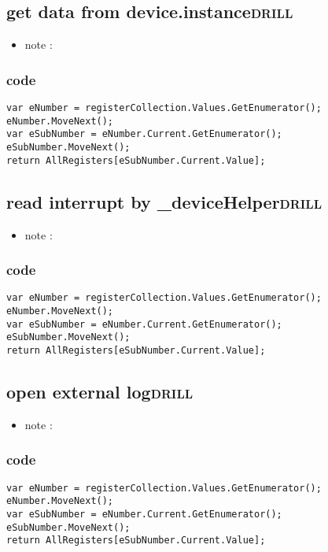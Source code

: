 \documentclass[11pt]{article}
\begin{document}
\subsection{get data from device.instance\hfill{}\textsc{drill}}
\label{sec:org396d1eb}
\begin{itemize}
\item note :
\end{itemize}
\subsubsection{code}
\label{sec:orgec638a7}
\begin{verbatim}
var eNumber = registerCollection.Values.GetEnumerator();
eNumber.MoveNext();
var eSubNumber = eNumber.Current.GetEnumerator();
eSubNumber.MoveNext();
return AllRegisters[eSubNumber.Current.Value];

\end{verbatim}

\subsection{read interrupt by \_deviceHelper\hfill{}\textsc{drill}}
\label{sec:org8c07efc}
\begin{itemize}
\item note :
\end{itemize}
\subsubsection{code}
\label{sec:org504a389}
\begin{verbatim}
var eNumber = registerCollection.Values.GetEnumerator();
eNumber.MoveNext();
var eSubNumber = eNumber.Current.GetEnumerator();
eSubNumber.MoveNext();
return AllRegisters[eSubNumber.Current.Value];

\end{verbatim}

\subsection{open external log\hfill{}\textsc{drill}}
\label{sec:orgdebc8d5}
\begin{itemize}
\item note :
\end{itemize}
\subsubsection{code}
\label{sec:org2f78e9d}
\begin{verbatim}
var eNumber = registerCollection.Values.GetEnumerator();
eNumber.MoveNext();
var eSubNumber = eNumber.Current.GetEnumerator();
eSubNumber.MoveNext();
return AllRegisters[eSubNumber.Current.Value];

\end{verbatim}
\end{document}
